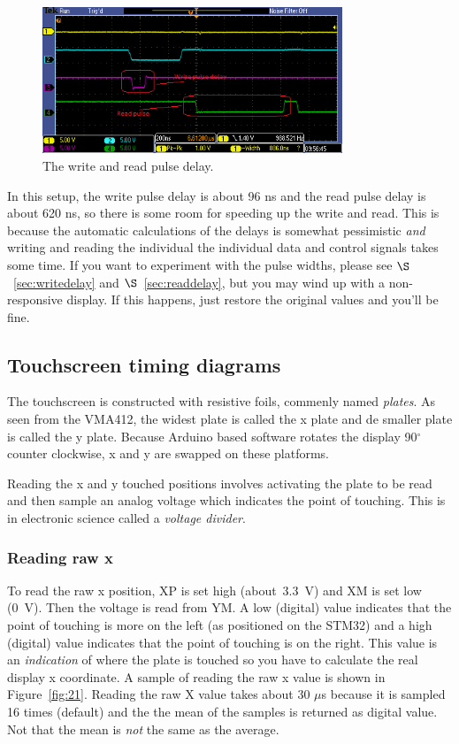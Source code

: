 \documentclass[12pt]{article}
\begin{document}
\begin{figure}[!ht]
\centering
\includegraphics[width=0.8\textwidth]{write_read_delay}
\caption{The write and read pulse delay.}
\label{fig:12}
\end{figure}

In this setup, the write pulse delay is about 96 ns and the read pulse delay is about 620 ns, so there is some room for speeding up the write and read. This is because the automatic calculations of the delays is somewhat pessimistic \textsl{and} writing and reading the individual the individual data and control signals takes some time. If you want to experiment with the pulse widths, please see $\S$~\ref{sec:writedelay} and $\S$~\ref{sec:readdelay}, but you may wind up with a non-responsive display. If this happens, just restore the original values and you'll be fine.


\subsection{Touchscreen timing diagrams}
The touchscreen is constructed with resistive foils, commenly named \textsl{plates}. As seen from the VMA412, the widest plate is called the x plate and de smaller plate is called the y plate. Because Arduino based software rotates the display 90$^\circ$ counter clockwise, x and y are swapped on these platforms.

Reading the x and y touched positions involves activating the plate to be read and then sample an analog voltage which indicates the point of touching. This is in electronic science called a \textsl{voltage divider}.

\subsubsection{Reading raw x}
To read the raw x position, XP is set high (about~3.3~V) and XM is set low (0~V). Then the voltage is read from YM. A low (digital) value indicates that the point of touching is more on the left (as positioned on the STM32) and a high (digital) value indicates that the point of touching is on the right. This value is an \textsl{indication} of where the plate is touched so you have to calculate the real display x coordinate. A sample of reading the raw x value is shown in Figure~\ref{fig:21}. Reading the raw X value takes about 30 $\mu$s because it is sampled 16 times (default) and the the mean of the samples is returned as digital value. Not that the mean is \textsl{not} the same as the average.
\end{document}
